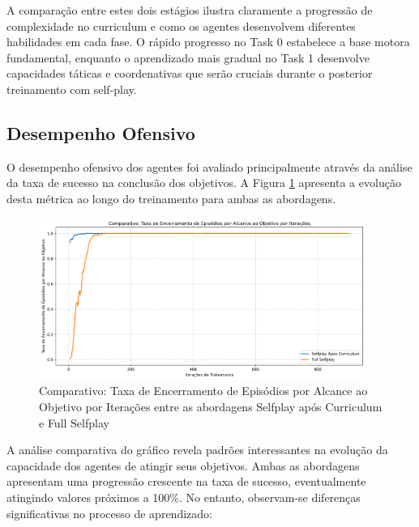 A comparação entre estes dois estágios ilustra claramente a progressão de complexidade no curriculum e como os agentes desenvolvem diferentes habilidades em cada fase. O rápido progresso no Task 0 estabelece a base motora fundamental, enquanto o aprendizado mais gradual no Task 1 desenvolve capacidades táticas e coordenativas que serão cruciais durante o posterior treinamento com self-play.

\subsection{Desempenho Ofensivo}

O desempenho ofensivo dos agentes foi avaliado principalmente através da análise da taxa de sucesso na conclusão dos objetivos. A Figura \ref{fig:goals_blue_comparison} apresenta a evolução desta métrica ao longo do treinamento para ambas as abordagens.

\begin{figure}[H]
    \centering
    \includegraphics[width=0.95\textwidth]{fig/graficos_trabalho/graficos_experimentos/geral/comparativo_taxa_encerramento_episodios.png}
    \caption{Comparativo: Taxa de Encerramento de Episódios por Alcance ao Objetivo por Iterações entre as abordagens Selfplay após Curriculum e Full Selfplay}
    \label{fig:goals_blue_comparison}
\end{figure}

A análise comparativa do gráfico revela padrões interessantes na evolução da capacidade dos agentes de atingir seus objetivos. Ambas as abordagens apresentam uma progressão crescente na taxa de sucesso, eventualmente atingindo valores próximos a 100\%. No entanto, observam-se diferenças significativas no processo de aprendizado:

